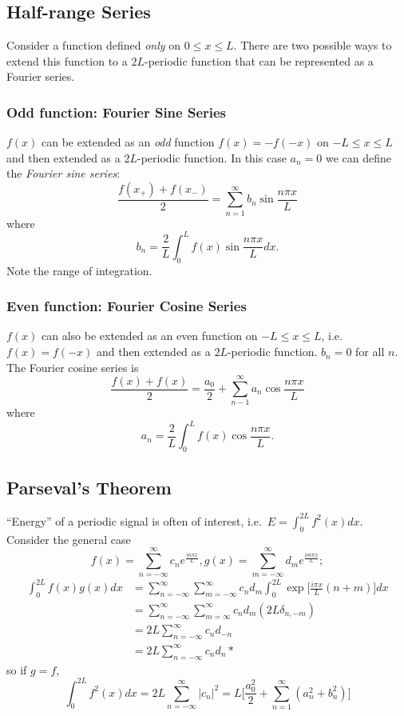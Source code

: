 \documentclass[a4paper]{article}
\begin{document}
\subsection{Half-range Series}

Consider a function defined \emph{only} on \(0 \leq x \leq L\). There are two possible ways to extend this function to a \(2L\)-periodic function that can be represented as a Fourier series.

\subsubsection{Odd function: Fourier Sine Series}

\(f(x)\) can be extended as an \emph{odd} function \(f(x)=-f(-x)\) on \(-L \leq x \leq L\) and then extended as a \(2L\)-periodic function. In this case \(a_n=0\) we can define the \emph{Fourier sine series}:
\[
  \frac{f(x_+)+f(x_-)}{2} = \sum_{n=1}^{\infty}b_n \sin \frac{n\pi x}{L}
\]
where
\[
  b_n = \frac{2}{L} \int_{0}^{L} f(x) \sin \frac{n\pi x}{L} dx.
\]
Note the range of integration.

\begin{eg}
  
\end{eg}

\subsubsection{Even function: Fourier Cosine Series}

\(f(x)\) can also be extended as an even function on \(-L\leq x\leq L\), i.e.\ \(f(x) = f(-x)\) and then extended as a \(2L\)-periodic function. \(b_n=0\) for all \(n\). The Fourier cosine series is
\[
  \frac{f(x)+f(x)}{2} = \frac{a_0}{2} + \sum_{n-1}^{\infty}a_n \cos \frac{n\pi x}{L}
\]
where
\[
  a_n = \frac{2}{L}\int_{0}^{L}f(x)\cos \frac{n\pi x}{L}.
\]

\subsection{Parseval's Theorem}

``Energy'' of a periodic signal is often of interest, i.e.\ \(E = \int_{0}^{2L}f^2(x) dx \). Consider the general case
\[
  f(x) = \sum_{n=-\infty}^{\infty}c_n e^{\frac{in\pi x}{L}}, g(x) = \sum_{m=-\infty}^{\infty}d_m e^{\frac{im\pi x}{L}};
\]
\begin{align*}
  \int_{0}^{2L} f(x) g(x) dx &= \sum_{n=-\infty}^{\infty} \sum_{m=-\infty}^{\infty} c_n d_m \int_{0}^{2L} \exp \Big [\frac{i\pi x}{L} (n+m) \Big] dx \\
  &= \sum_{n=-\infty}^{\infty} \sum_{m=\infty}^{\infty} c_n d_m (2L \delta_{n,-m}) \\
  &= 2L \sum_{n=-\infty}^{\infty} c_n d_{-n} \\
  &= 2L \sum_{n=-\infty}^{\infty} c_n d_n*
  \end{align*}
so if \(g=f\),
\[
  \int_{0}^{2L} f^2(x) dx = 2L \sum_{n=-\infty}^{\infty}|c_n|^2 = L \Big[ \frac{a_0^2}{2} + \sum_{n=1}^{\infty}(a_n^2+b_n^2) \Big]
\]
\end{document}
